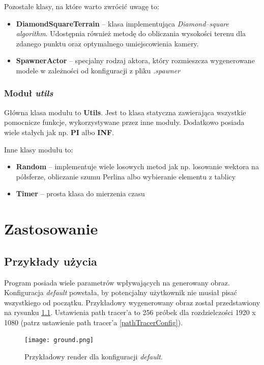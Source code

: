 \documentclass[inz,shortabstract]{iithesis}
\begin{document}
            Pozostałe klasy, na które warto zwrócić uwagę to:
            \begin{itemize}
                \item \textbf{DiamondSquareTerrain} -- klasa implementująca \textit{Diamond--square algorithm}. Udostępnia również metodę do obliczania wysokości terenu dla zdanego punktu oraz optymalnego umiejscowienia kamery.
                \item \textbf{SpawnerActor} -- specjalny rodzaj aktora, który rozmieszcza wygenerowane modele w zależności od konfiguracji z pliku \textit{.spawner} 
            \end{itemize}
            
        \subsection{Moduł \textit{utils}}
            Główna klasa modułu to \textbf{Utils}. Jest to klasa statyczna zawierająca wszystkie pomocnicze funkcje, wykorzystywane przez inne moduły. Dodatkowo posiada wiele stałych jak np. \textbf{PI} albo \textbf{INF}.
            
            Inne klasy modułu to:
            \begin{itemize}
                \item \textbf{Random} -- implementuje wiele losowych metod jak np. losowanie wektora na półsferze, obliczanie szumu Perlina albo wybieranie elementu z tablicy
                \item \textbf{Timer} -- prosta klasa do mierzenia czasu  
            \end{itemize}
            
\chapter{Zastosowanie}
    \section{Przykłady użycia}
        Program posiada wiele parametrów wpływających na generowany obraz. Konfiguracja \textit{default} powstała, by potencjalny użytkownik nie musiał pisać wszystkiego od początku. Przykładowy wygenerowany obraz został przedstawiony na rysunku \ref{fig:ground}. Ustawienia path tracer'a to 256 próbek dla rozdzielczości 1920 x 1080 (patrz ustawienie path tracer'a \ref{pathTracerConfig}).
        \begin{figure}[!htbp]
            \texttt{[image: ground.png]}
            \caption{Przykładowy render dla konfiguracji \textit{default}.} 
            \label{fig:ground}
        \end{figure}
        
\end{document}
